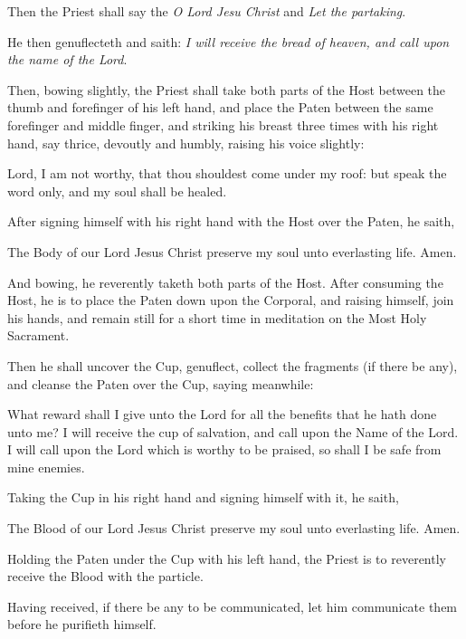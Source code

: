 \begin{multicols}{2}
\begin{rubric}
    Then the Priest shall say the \emph{O Lord Jesu Christ} and \emph{Let the partaking}.
\end{rubric}
\begin{rubric}
    He then genuflecteth and saith: \emph{I will receive the bread of heaven, and call upon the name of the Lord}.
\end{rubric}
\begin{rubric}
    Then, bowing slightly, the Priest shall take both parts of the Host between the thumb and forefinger of his left hand, and place the Paten between the same forefinger and middle finger, and striking his breast three times with his right hand, say thrice, devoutly and humbly, raising his voice slightly:
\end{rubric}\par\noindent
    Lord, I am not worthy,  that thou shouldest come under my roof: but speak the word only, and my soul shall be healed.
\begin{rubric}
After signing himself with his right hand with the Host over the Paten, he saith,
\end{rubric}\par\noindent
The Body of our Lord Jesus Christ preserve my soul unto everlasting life. Amen.
\begin{rubric}
And bowing, he reverently taketh both parts of the Host. After consuming the Host, he is to place the Paten down upon the Corporal, and raising himself, join his hands, and remain still for a short time in meditation on the Most Holy Sacrament.
\end{rubric}
\begin{rubric}
	Then he shall uncover the Cup, genuflect, collect the fragments (if there be any), and cleanse the Paten over the Cup, saying meanwhile:
\end{rubric}
\par\noindent
What reward shall I give unto the Lord for all the benefits that he hath done unto me? I will receive the cup of salvation, and call upon the Name of the Lord. I will call upon the Lord which is worthy to be praised, so shall I be safe from mine enemies.
\begin{rubric}
    Taking the Cup in his right hand and signing himself with it, he saith,
\end{rubric}\par\noindent
The Blood of our Lord Jesus Christ preserve my soul unto everlasting life. Amen.
\begin{rubric}
    Holding the Paten under the Cup with his left hand, the Priest is to reverently receive the Blood with the particle.
\end{rubric}
\begin{rubric}
	Having received, if there be any to be communicated, let him communicate them before he purifieth himself.
\end{rubric}
\end{multicols}

